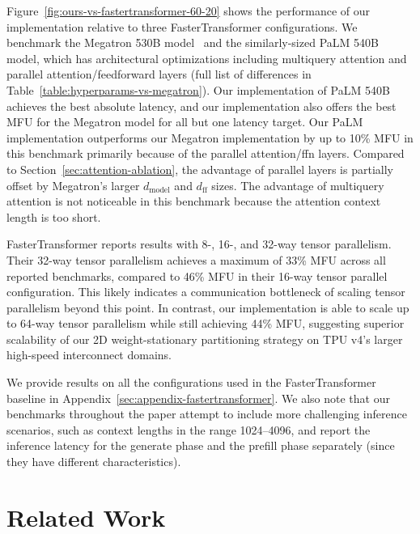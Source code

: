 Figure~\ref{fig:ours-vs-fastertransformer-60-20} shows the performance of our implementation relative to three FasterTransformer configurations. We benchmark the Megatron 530B model~\cite{smith2022using} and the similarly-sized PaLM 540B model, which has architectural optimizations including multiquery attention and parallel attention/feedforward layers (full list of differences in Table~\ref{table:hyperparams-vs-megatron}). Our implementation of PaLM 540B achieves the best absolute latency, and our implementation also offers the best MFU for the Megatron model for all but one latency target. Our PaLM implementation outperforms our Megatron implementation by up to 10\% MFU in this benchmark primarily because of the parallel attention/ffn layers. Compared to Section~\ref{sec:attention-ablation}, the advantage of parallel layers is partially offset by Megatron's larger $d_{\textrm{model}}$ and $d_{\textrm{ff}}$ sizes. The advantage of multiquery attention is not noticeable in this benchmark because the attention context length is too short.

FasterTransformer reports results with 8-, 16-, and 32-way tensor parallelism. Their 32-way tensor parallelism achieves a maximum of 33\% MFU across all reported benchmarks, compared to 46\% MFU in their 16-way tensor parallel configuration. This likely indicates a communication bottleneck of scaling tensor parallelism beyond this point. In contrast, our implementation is able to scale up to 64-way tensor parallelism while still achieving 44\% MFU, suggesting superior scalability of our 2D weight-stationary partitioning strategy on TPU v4's larger high-speed interconnect domains.

We provide results on all the configurations used in the FasterTransformer baseline in Appendix~\ref{sec:appendix-fastertransformer}. We also note that our benchmarks throughout the paper attempt to include more challenging inference scenarios, such as context lengths in the range 1024--4096, and report the inference latency for the generate phase and the prefill phase separately (since they have different characteristics).

\section{Related Work}\label{sec:relatedwork}
